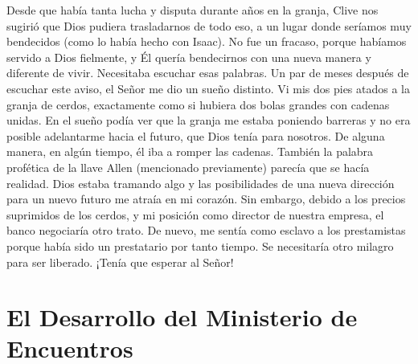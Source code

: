 \documentclass[twoside, 12pt]{book}
\begin{document}
Desde que había tanta lucha y disputa durante años en la granja,  Clive nos sugirió que Dios pudiera trasladarnos de todo eso, a un lugar donde seríamos muy bendecidos (como lo había hecho con Isaac). No fue un fracaso, porque habíamos servido a Dios fielmente, y Él quería bendecirnos con una nueva manera y diferente de vivir. Necesitaba escuchar esas palabras. Un par de meses después de escuchar este aviso, el Señor me dio un sueño distinto. Vi mis dos pies atados a la granja de cerdos, exactamente como si hubiera dos bolas grandes con cadenas unidas. En el sueño podía ver que la granja me estaba poniendo barreras y no era posible adelantarme hacia el futuro, que Dios tenía para nosotros. De alguna manera, en algún tiempo, él iba a romper las cadenas. También la palabra profética de la llave Allen (mencionado previamente) parecía que se hacía realidad.  Dios estaba tramando algo y las posibilidades de una nueva dirección para un nuevo futuro me atraía en mi corazón.  Sin embargo, debido a los precios suprimidos de los cerdos, y mi posición como director de nuestra empresa, el banco negociaría otro trato. De nuevo, me sentía como esclavo a los prestamistas porque había sido un prestatario por tanto tiempo.  Se necesitaría otro milagro para ser liberado.  ¡Tenía que esperar al Señor!\\




\chapter{El Desarrollo del Ministerio de Encuentros}
\
\end{document}
